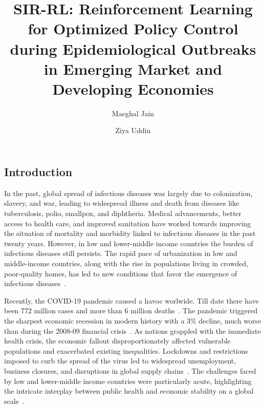 \documentclass[tikz,fleqn,12pt]{wlscirep}
\title{SIR-RL: Reinforcement Learning for Optimized Policy Control during Epidemiological Outbreaks in Emerging Market and Developing Economies}
\author[1,*]{Maeghal Jain}
\author[1]{Ziya Uddin}
\affil[1]{BML Munjal University}
\affil[*]{e-mail: maeghaljain@gmail.com}
\begin{document}
\flushbottom
\maketitle
\thispagestyle{empty}
\subsection*{Introduction}
In the past, global spread of infectious diseases was largely due to colonization, slavery, and war, leading to widespread illness and death from diseases like tuberculosis, polio, smallpox, and diphtheria. Medical advancements, better access to health care, and improved sanitation have worked towards improving the situation of mortality and morbidity linked to infectious diseases in the past twenty years. However, in low and lower-middle income countries the burden of infectious diseases still persists. The rapid pace of urbanization in low and middle-income countries, along with the rise in populations living in crowded, poor-quality homes, has led to new conditions that favor the emergence of infectious diseases~\cite{Baker2022, inequitableworld}.

Recently, the COVID-19 pandemic caused a havoc worlwide. Till date there have been 772 million cases and more than 6 million deaths~\cite{WHOCovid}. The pandemic triggered the sharpest economic recession in modern history with a 3\% decline, much worse than during the 2008-09 financial crisis~\cite{IMFCovid}. As nations grappled with the immediate health crisis, the economic fallout disproportionately affected vulnerable populations and exacerbated existing inequalities. Lockdowns and restrictions imposed to curb the spread of the virus led to widespread unemployment, business closures, and disruptions in global supply chains~\cite{Nicola2020}. The challenges faced by low and lower-middle income countries were particularly acute, highlighting the intricate interplay between public health and economic stability on a global scale~\cite{Gagnon2023}. 
\end{document}
